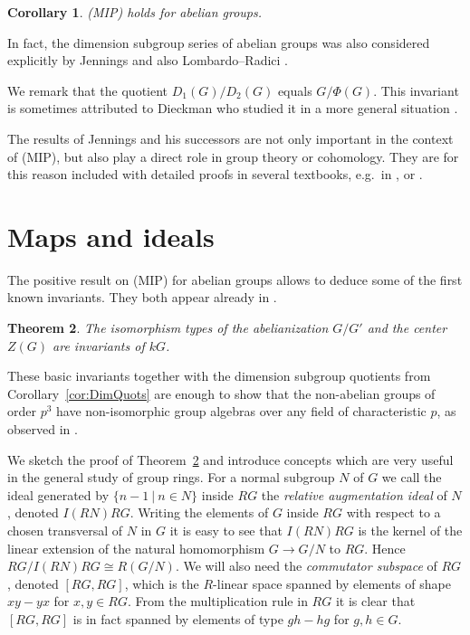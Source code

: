 \documentclass[11pt, a4paper]{amsart}
\newtheorem{theorem}{Theorem}[section]
\newtheorem{corollary}[theorem]{Corollary}
\theoremstyle{definition}
\begin{document}
\begin{corollary} \cite{Deskins56}
(MIP) holds for abelian groups.
\end{corollary}

In fact, the dimension subgroup series of abelian groups was also considered explicitly by Jennings \cite{Jennings41} and also Lombardo--Radici \cite{LombardoRadici}.

We remark that the quotient $D_1(G)/D_2(G)$ equals $G/\Phi(G)$. This invariant is sometimes attributed to Dieckman who studied it in a more general situation \cite{Dieckman67}. 

The results of Jennings and his successors are not only important in the context of (MIP), but also play a direct role in group theory or cohomology. They are for this reason included with detailed proofs in several textbooks, e.g.\ in \cite[Chapter VIII]{HuppertII}, \cite[Chapter 11]{DdSMS99} or \cite[Section 3.14]{BensonBookI}.

\section{Maps and ideals}\label{sec:maps}

The positive result on (MIP) for abelian groups allows to deduce some of the first known invariants. They both appear already in \cite{Passmanp4}.

\begin{theorem}\label{th:AbAndCent}
The isomorphism types of the abelianization $G/G'$ and the center $Z(G)$ are invariants of $kG$.
\end{theorem}

These basic invariants together with the dimension subgroup quotients from Corollary~\ref{cor:DimQuots} are enough to show that the non-abelian groups of order $p^3$ have non-isomorphic group algebras over any field of characteristic $p$, as observed in \cite{Passmanp4}.

We sketch the proof of Theorem~\ref{th:AbAndCent} and introduce concepts which are very useful in the general study of group rings. For a normal subgroup $N$ of $G$ we call the ideal generated by $\{n - 1 \ | \ n \in N \}$ inside $RG$ the \emph{relative augmentation ideal} of $N$, denoted $I(RN)RG$. Writing the elements of $G$ inside $RG$ with respect to a chosen transversal of $N$ in $G$ it is easy to see that $I(RN)RG$ is the kernel of the linear extension of the natural homomorphism $G \rightarrow G/N$ to $RG$. Hence $RG/I(RN)RG \cong R(G/N)$.  We will also need the \emph{commutator subspace} of $RG$, denoted $[RG,RG]$, which is the $R$-linear space spanned by elements of shape $xy - yx$ for $x,y \in RG$. From the multiplication rule in $RG$ it is clear that $[RG,RG]$ is in fact spanned by elements of type $gh-hg$ for $g,h \in G$.
\end{document}
